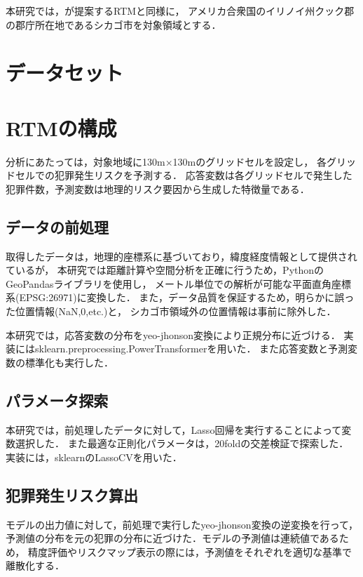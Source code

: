 \documentclass[12pt,a4paper,oneside]{jsbook}
\theoremstyle{plain}
\begin{document}
本研究では，\citet{caplan2015risk}が提案するRTMと同様に，
アメリカ合衆国のイリノイ州クック郡の郡庁所在地であるシカゴ市を対象領域とする．

\section{データセット}

  
\section{RTMの構成}
分析にあたっては，対象地域に130m×130mのグリッドセルを設定し，
各グリッドセルでの犯罪発生リスクを予測する．
応答変数は各グリッドセルで発生した犯罪件数，予測変数は地理的リスク要因から生成した特徴量である．

\subsection{データの前処理}
取得したデータは，地理的座標系に基づいており，緯度経度情報として提供されているが，
本研究では距離計算や空間分析を正確に行うため，PythonのGeoPandasライブラリを使用し，
メートル単位での解析が可能な平面直角座標系(EPSG:26971)に変換した．
また，データ品質を保証するため，明らかに誤った位置情報(NaN,0,etc.)と，
シカゴ市領域外の位置情報は事前に除外した．

本研究では，応答変数の分布をyeo-jhonson変換\citep{weisberg2001yeo}により正規分布に近づける．
実装にはsklearn.preprocessing.PowerTransformerを用いた．
また応答変数と予測変数の標準化も実行した．

\subsection{パラメータ探索}
本研究では，前処理したデータに対して，Lasso回帰を実行することによって変数選択した．
また最適な正則化パラメータは，20foldの交差検証で探索した．
実装には，sklearnのLassoCVを用いた．


\subsection{犯罪発生リスク算出}
モデルの出力値に対して，前処理で実行したyeo-jhonson変換の逆変換を行って，
予測値の分布を元の犯罪の分布に近づけた．モデルの予測値は連続値であるため，
精度評価やリスクマップ表示の際には，予測値をそれぞれを適切な基準で離散化する．
\end{document}
